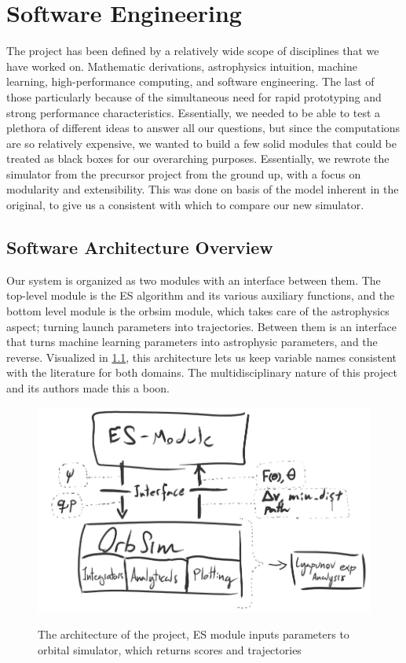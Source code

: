 
\chapter{Software Engineering}

The project has been defined by a relatively wide scope of disciplines that we have worked on. Mathematic derivations, astrophysics intuition, machine learning, high-performance computing, and software engineering. The last of those particularly because of the simultaneous need for rapid prototyping and strong performance characteristics. Essentially, we needed to be able to test a plethora of different ideas to answer all our questions, but since the computations are so relatively expensive, we wanted to build a few solid modules that could be treated as black boxes for our overarching purposes. Essentially, we rewrote the simulator from the precursor project from the ground up, with a focus on modularity and extensibility. This was done on basis of the model inherent in the original, to give us a consistent  with which to compare our new simulator.




\section{Software Architecture Overview}
Our system is organized as two modules with an interface between them. The top-level module is the ES algorithm and its various auxiliary functions, and the bottom level module is the orbsim module, which takes care of the astrophysics aspect; turning launch parameters into trajectories. Between them is an interface that turns machine learning parameters into astrophysic parameters, and the reverse. Visualized in \cref{fig:software_architecture}, this architecture lets us keep variable names consistent with the literature for both domains. The multidisciplinary nature of this project and its authors made this a boon.

\begin{figure}
    \centering
    \includegraphics[width=0.76\linewidth]{fig/software_architecture}
    \label{fig:software_architecture}
    \caption{The architecture of the project, ES module inputs parameters to orbital simulator, which returns scores and trajectories}
\end{figure}

